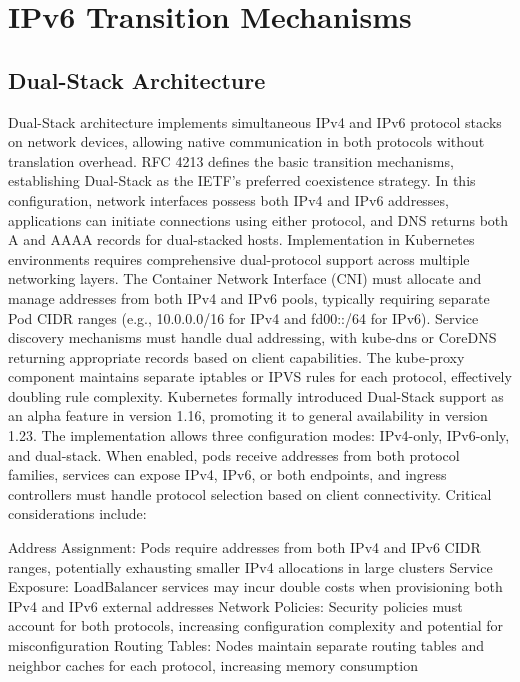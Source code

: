 \section{IPv6 Transition Mechanisms}

\subsection{Dual-Stack Architecture}
Dual-Stack architecture implements simultaneous IPv4 and IPv6 protocol stacks on network devices, allowing native communication in both protocols without translation overhead. RFC 4213 defines the basic transition mechanisms, establishing Dual-Stack as the IETF's preferred coexistence strategy. In this configuration, network interfaces possess both IPv4 and IPv6 addresses, applications can initiate connections using either protocol, and DNS returns both A and AAAA records for dual-stacked hosts.
Implementation in Kubernetes environments requires comprehensive dual-protocol support across multiple networking layers. The Container Network Interface (CNI) must allocate and manage addresses from both IPv4 and IPv6 pools, typically requiring separate Pod CIDR ranges (e.g., 10.0.0.0/16 for IPv4 and fd00::/64 for IPv6). Service discovery mechanisms must handle dual addressing, with kube-dns or CoreDNS returning appropriate records based on client capabilities. The kube-proxy component maintains separate iptables or IPVS rules for each protocol, effectively doubling rule complexity.
Kubernetes formally introduced Dual-Stack support as an alpha feature in version 1.16, promoting it to general availability in version 1.23. The implementation allows three configuration modes: IPv4-only, IPv6-only, and dual-stack. When enabled, pods receive addresses from both protocol families, services can expose IPv4, IPv6, or both endpoints, and ingress controllers must handle protocol selection based on client connectivity. Critical considerations include:

Address Assignment: Pods require addresses from both IPv4 and IPv6 CIDR ranges, potentially exhausting smaller IPv4 allocations in large clusters
Service Exposure: LoadBalancer services may incur double costs when provisioning both IPv4 and IPv6 external addresses
Network Policies: Security policies must account for both protocols, increasing configuration complexity and potential for misconfiguration
Routing Tables: Nodes maintain separate routing tables and neighbor caches for each protocol, increasing memory consumption

